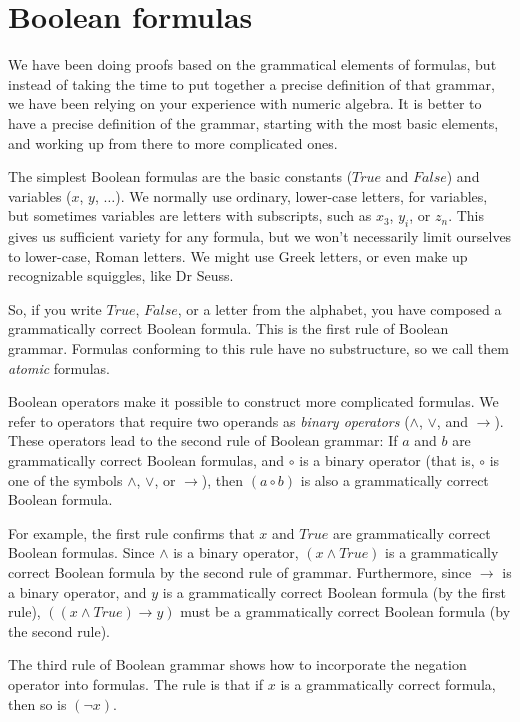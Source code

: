 \section{Boolean formulas}
\label{sec:boolean-formuas}

We have been doing proofs based on the grammatical elements of formulas,
but instead of taking the time to put together a precise definition of that grammar,
we have been relying on your experience with numeric algebra.
It is better to have a precise definition of the grammar,
starting with the most basic elements,
and working up from there to more complicated ones.

The simplest Boolean formulas are the basic constants ($True$ and $False$)
and variables ($x$, $y$, $\dots$). We normally use ordinary, lower-case letters,
for variables, but sometimes variables are letters with subscripts,
such as $x_3$, $y_i$, or $z_n$.
This gives us sufficient variety for any formula,
but we won't necessarily limit ourselves to lower-case, Roman letters.
We might use Greek letters, or
even make up recognizable squiggles, like Dr Seuss.

So, if you write $True$, $False$, or a letter from the alphabet,
you have composed a grammatically correct Boolean formula.
This is the first rule of Boolean grammar.
Formulas conforming to this rule have no substructure,
so we call them \emph{atomic} formulas.

Boolean operators make it possible to construct more complicated formulas.
We refer to operators that require two operands as \emph{binary operators }
($\wedge$, $\vee$, and $\rightarrow$).
These operators lead to the second rule of Boolean grammar:
If $a$ and $b$ are grammatically correct Boolean formulas,
 and $\circ$ is a binary operator
 (that is, $\circ$ is one of the symbols $\wedge$, $\vee$, or $\rightarrow$),
 then $(a \circ b)$ is also a grammatically correct Boolean formula.

For example, the first rule confirms that $x$ and $True$ are
grammatically correct Boolean formulas. Since $\wedge$ is a binary operator,
$(x \wedge True)$ is a grammatically correct Boolean formula by the
second rule of grammar. Furthermore, since $\rightarrow$ is a binary operator,
and $y$ is a grammatically correct Boolean formula (by the first rule),
$((x \wedge True) \rightarrow y)$ must be a grammatically correct
Boolean formula (by the second rule).

The third rule of Boolean grammar shows how to incorporate the negation operator into formulas.
The rule is that if $x$ is a grammatically correct formula, then so is $(\neg x)$.

